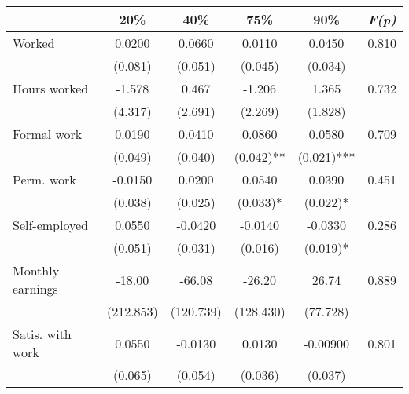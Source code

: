 \begin{tabular}{lccccc} \hline \hline
\multicolumn{1}{l}{} & \multicolumn{1}{c}{20\%} &\multicolumn{1}{c}{40\%} & \multicolumn{1}{c}{75\%} & \multicolumn{1}{c}{90\%} & \multicolumn{1}{c}{\emph{F(p)}} \\ \hline
Worked & 0.0200 & 0.0660 & 0.0110 & 0.0450 & 0.810 \\
& (0.081) & (0.051) & (0.045) & (0.034) &  \\
Hours worked & -1.578 & 0.467 & -1.206 & 1.365 & 0.732 \\
& (4.317) & (2.691) & (2.269) & (1.828) &  \\
Formal work & 0.0190 & 0.0410 & 0.0860 & 0.0580 & 0.709 \\
& (0.049) & (0.040) & (0.042)** & (0.021)*** &  \\
Perm. work & -0.0150 & 0.0200 & 0.0540 & 0.0390 & 0.451 \\
& (0.038) & (0.025) & (0.033)* & (0.022)* &  \\
Self-employed & 0.0550 & -0.0420 & -0.0140 & -0.0330 & 0.286 \\
& (0.051) & (0.031) & (0.016) & (0.019)* &  \\
Monthly earnings & -18.00 & -66.08 & -26.20 & 26.74 & 0.889 \\
& (212.853) & (120.739) & (128.430) & (77.728) &  \\
Satis. with work & 0.0550 & -0.0130 & 0.0130 & -0.00900 & 0.801 \\
& (0.065) & (0.054) & (0.036) & (0.037) &  \\ \hline
\end{tabular}
